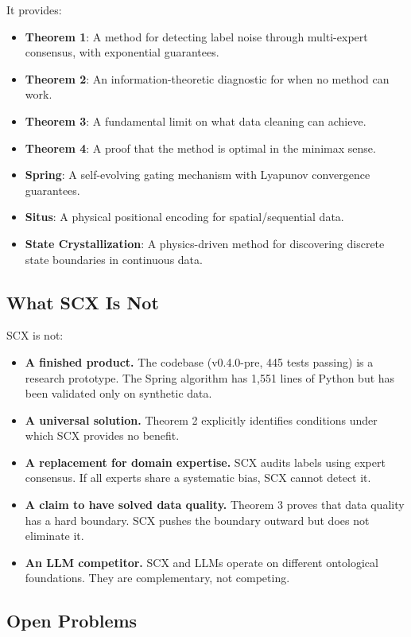 \documentclass[12pt,a4paper]{ctexart}
\begin{document}
It provides:
\begin{itemize}
\item \textbf{Theorem 1}: A method for detecting label noise through multi-expert consensus, with exponential guarantees.
\item \textbf{Theorem 2}: An information-theoretic diagnostic for when no method can work.
\item \textbf{Theorem 3}: A fundamental limit on what data cleaning can achieve.
\item \textbf{Theorem 4}: A proof that the method is optimal in the minimax sense.
\item \textbf{Spring}: A self-evolving gating mechanism with Lyapunov convergence guarantees.
\item \textbf{Situs}: A physical positional encoding for spatial/sequential data.
\item \textbf{State Crystallization}: A physics-driven method for discovering discrete state boundaries in continuous data.
\end{itemize}

\subsection*{What SCX Is Not}

SCX is not:
\begin{itemize}
\item \textbf{A finished product.} The codebase (v0.4.0-pre, 445 tests passing) is a research prototype. The Spring algorithm has 1,551 lines of Python but has been validated only on synthetic data.
\item \textbf{A universal solution.} Theorem 2 explicitly identifies conditions under which SCX provides no benefit.
\item \textbf{A replacement for domain expertise.} SCX audits labels using expert consensus. If all experts share a systematic bias, SCX cannot detect it.
\item \textbf{A claim to have solved data quality.} Theorem 3 proves that data quality has a hard boundary. SCX pushes the boundary outward but does not eliminate it.
\item \textbf{An LLM competitor.} SCX and LLMs operate on different ontological foundations. They are complementary, not competing.
\end{itemize}

\subsection*{Open Problems}
\end{document}
